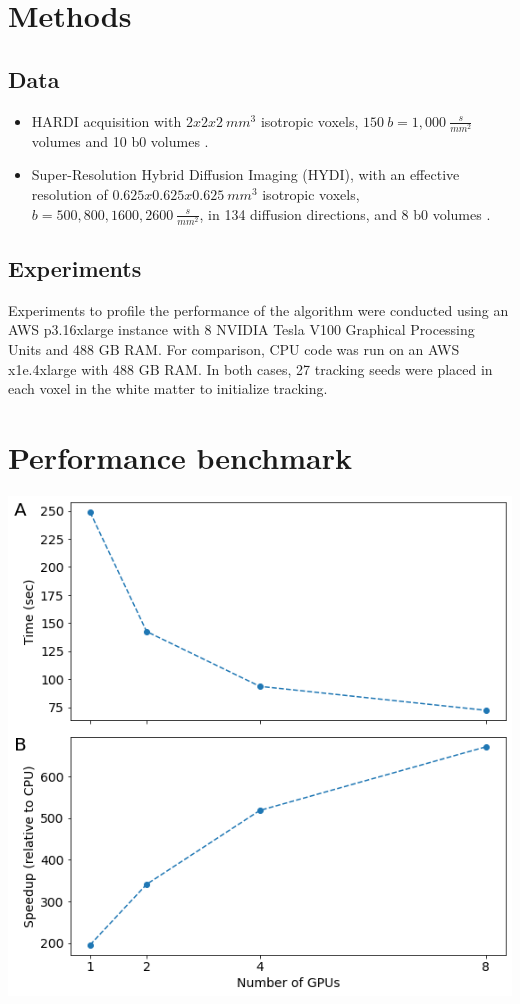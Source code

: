 \documentclass[a0, landscape]{a0poster}
\begin{document}
\begin{multicols}{3}
\section*{Methods}


\subsection*{Data}
\begin{itemize}

\item HARDI acquisition with $2x2x2~mm^3$ isotropic voxels, $150~b=1,000~\frac{s}{mm^2}$ volumes and 10 b0 volumes \cite{rokem2015evaluating}.

\item Super-Resolution Hybrid Diffusion Imaging  (HYDI), with an effective resolution of $0.625x0.625x0.625~mm^3$ isotropic voxels, $b=500, 800, 1600, 2600~\frac{s}{mm^2}$, in 134 diffusion directions, and 8 b0 volumes \cite{elsaidsuper}.
\end{itemize}

\vfill
\columnbreak

\subsection*{Experiments}

\noindent Experiments to profile the performance of the algorithm were conducted using an AWS p3.16xlarge instance with 8 NVIDIA Tesla V100 Graphical Processing Units and 488 GB RAM. For comparison, CPU code was run on an AWS x1e.4xlarge with 488 GB RAM. In both cases, 27 tracking seeds were placed in each voxel in the white matter to initialize tracking.

\color{Navy}



\section*{Performance benchmark}

\includegraphics[width=0.65\linewidth]{benchmark.png}


\end{multicols}
\end{document}
